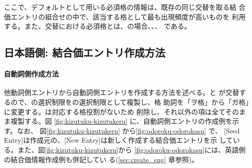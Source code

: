 \documentclass[japanese]{jnlp}
\newcommand{\abs}{}
\newcommand{\sbj}{}
\newcommand{\obj}{}
\newcommand{\soalt}{}
\begin{document}
 ここで、デフォルトとして用いる必須格の情報は、既存の同じ交替を取る結
 合価エントリの組合せの中で、該当する格として最も出現頻度が高いものを
 利用する。また、交替における必須格とは、\soalt{}の場合、\abs{}、\obj{}、
 \sbj{}である。
 




\subsection{日本語側: 結合価エントリ作成方法} \label{sec:Experimental_Method}


\paragraph{自動詞側作成方法} \label{sec:jap-int}



他動詞側エントリから自動詞側エントリを作成する方法を述べる。\obj{}と
\sbj{}が交替するので、\obj の選択制限を\sbj の選択制限として複製し、格
助詞を「ヲ格」から「ガ格」に変更する。\abs は対応する格役割がないため
削除し、それ以外の項は全てそのまま複製する。図
\ref{fig:kizutuku-kizutukeru} に、自動詞側エントリの作成例を示す。なお、
図\ref{fig:kizutuku-kizutukeru} から\ref{fig:odoroku-odorokasu} で、
[Seed Entry]は作成元の、[New Entry]は新しく作成する結合価エントリを示
している。また、図\ref{fig:kizutuku-kizutukeru}から
\ref{fig:odoroku-odorokasu}には、英語側の結合価情報作成例も併記してい
る(\ref{sec:create_eng} 章参照)。
\end{document}
